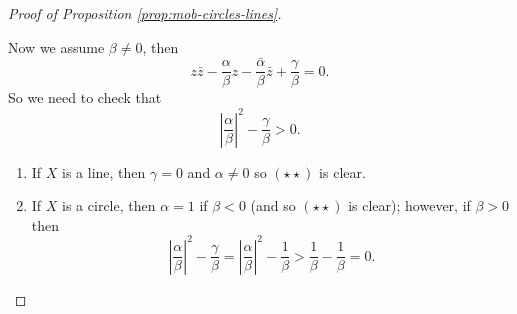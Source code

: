 \begin{proof}[Proof of Proposition \ref{prop:mob-circles-lines}]
\begin{enumerate}
    \end{enumerate}
    Now we assume $\beta \neq 0$, then
    \[ z \bar z - \frac{\alpha}{\beta} z - \frac{\bar \alpha}{\beta} \bar z + \frac{\gamma}{\beta} = 0. \]
    So we need to check that 
    \[ \left\lvert \frac{\alpha}{\beta} \right\rvert^2 - \frac{\gamma}{\beta} > 0. \tag{$\star\star$} \]
    \begin{enumerate}
        \item If $X$ is a line, then $\gamma = 0$ and $\alpha \neq 0$ so $(\star\star)$ is clear.
        \item If $X$ is a circle, then $\alpha = 1$ if $\beta < 0$ (and so $(\star\star)$ is clear); however, if $\beta > 0$ then
            \[ \left\lvert \frac{\alpha}{\beta} \right\rvert^2 - \frac{\gamma}{\beta} = \left\lvert \frac{\alpha}{\beta} \right\rvert^2 - \frac{1}{\beta} > \frac{1}{\beta} - \frac{1}{\beta} = 0. \]
    \end{enumerate}
\end{proof}
